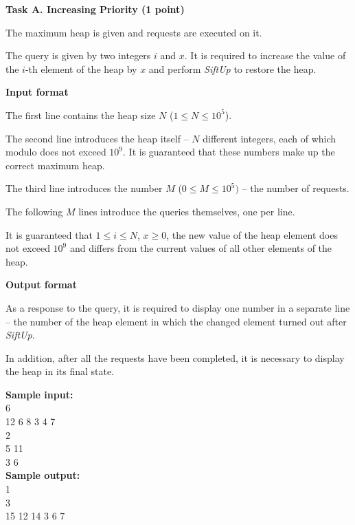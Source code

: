 \documentclass[a4paper]{article}
\begin{document}
\textbf{Task A. Increasing Priority (1 point)}

\SPACE

The maximum heap is given and requests are executed on it.

The query is given by two integers $i$ and $x$. It is required to increase the value of the $i$-th element of the heap by $x$ and perform \textit{SiftUp} to restore the heap.

\SPACE

\textbf{Input format}

The first line contains the heap size $N$ ($1 \le N \le 10^5$).

The second line introduces the heap itself -- $N$ different integers, each of which modulo does not exceed $10^9$. It is guaranteed that these numbers make up the correct maximum heap.

The third line introduces the number $M$ ($0 \le M \le 10^5)$ -- the number of requests.

The following $M$ lines introduce the queries themselves, one per line.

It is guaranteed that $1 \le i \le N$, $x \ge 0$, the new value of the heap element does not exceed $10^9$ and differs from the current values of all other elements of the heap.

\SPACE

\textbf{Output format}

As a response to the query, it is required to display one number in a separate line -- the number of the heap element in which the changed element turned out after \textit{SiftUp}.

In addition, after all the requests have been completed, it is necessary to display the heap in its final state.

\SPACE

\noindent \textbf{Sample input:}\\
6\\
12 6 8 3 4 7\\
2\\
5 11\\
3 6\\


\noindent \textbf{Sample output:}\\
1\\
3\\
15 12 14 3 6 7\\
\end{document}
